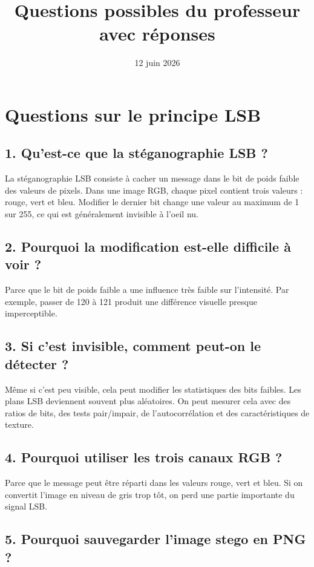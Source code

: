 \documentclass[11pt,a4paper]{article}
\title{\textbf{Questions possibles du professeur avec réponses}}
\date{12 juin 2026}
\begin{document}
\maketitle
\tableofcontents
\newpage

\section{Questions sur le principe LSB}

\subsection{1. Qu'est-ce que la stéganographie LSB ?}

La stéganographie LSB consiste à cacher un message dans le bit de poids faible des valeurs de pixels. Dans une image RGB, chaque pixel contient trois valeurs : rouge, vert et bleu. Modifier le dernier bit change une valeur au maximum de 1 sur 255, ce qui est généralement invisible à l'oeil nu.

\subsection{2. Pourquoi la modification est-elle difficile à voir ?}

Parce que le bit de poids faible a une influence très faible sur l'intensité. Par exemple, passer de 120 à 121 produit une différence visuelle presque imperceptible.

\subsection{3. Si c'est invisible, comment peut-on le détecter ?}

Même si c'est peu visible, cela peut modifier les statistiques des bits faibles. Les plans LSB deviennent souvent plus aléatoires. On peut mesurer cela avec des ratios de bits, des tests pair/impair, de l'autocorrélation et des caractéristiques de texture.

\subsection{4. Pourquoi utiliser les trois canaux RGB ?}

Parce que le message peut être réparti dans les valeurs rouge, vert et bleu. Si on convertit l'image en niveau de gris trop tôt, on perd une partie importante du signal LSB.

\subsection{5. Pourquoi sauvegarder l'image stego en PNG ?}
\end{document}
